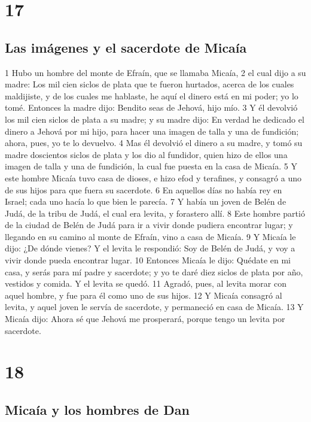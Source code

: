 \chapter{17}

\section*{Las imágenes y el sacerdote de Micaía }


1 Hubo un hombre del monte de Efraín, que se llamaba Micaía,
2 el cual dijo a su madre: Los mil cien siclos de plata   que te fueron hurtados, acerca de los cuales maldijiste, y de los cuales me hablaste, he aquí el dinero está en mi poder; yo lo tomé. Entonces la madre dijo: Bendito seas de Jehová, hijo mío.
3 Y él devolvió los mil cien siclos de plata   a su madre; y su madre dijo: En verdad he dedicado el dinero a Jehová por mi hijo, para hacer una imagen de talla y una de fundición; ahora, pues, yo te lo devuelvo.
4 Mas él devolvió el dinero a su madre, y tomó su madre doscientos siclos de plata   y los dio al fundidor, quien hizo de ellos una imagen de talla y una de fundición, la cual fue puesta en la casa de Micaía.
5 Y este hombre Micaía tuvo casa de dioses, e hizo efod y terafines, y consagró a uno de sus hijos para que fuera su sacerdote.
6 En aquellos días no había rey en Israel; cada uno hacía lo que bien le parecía. 
7 Y había un joven de Belén de Judá, de la tribu de Judá, el cual era levita, y forastero allí.
8 Este hombre partió de la ciudad de Belén de Judá para ir a vivir donde pudiera encontrar lugar; y llegando en su camino al monte de Efraín, vino a casa de Micaía.
9 Y Micaía le dijo: ¿De dónde vienes? Y el levita le respondió: Soy de Belén de Judá, y voy a vivir donde pueda encontrar lugar.
10 Entonces Micaía le dijo: Quédate en mi casa, y serás para mí padre y sacerdote; y yo te daré diez siclos de plata   por año, vestidos y comida. Y el levita se quedó. 
11 Agradó, pues, al levita morar con aquel hombre, y fue para él como uno de sus hijos.
12 Y Micaía consagró al levita, y aquel joven le servía de sacerdote, y permaneció en casa de Micaía.
13 Y Micaía dijo: Ahora sé que Jehová me prosperará, porque tengo un levita por sacerdote.

\chapter{18}

\section*{Micaía y los hombres de Dan}


